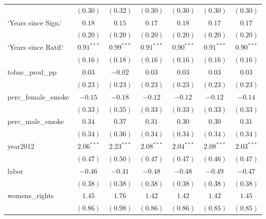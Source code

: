 \begin{table}[!h]
\begin{center}
\begin{tabular}{l c c c c c c }
                        & $(0.30)$     & $(0.32)$     & $(0.30)$     & $(0.30)$     & $(0.30)$     & $(0.30)$     \\
`Years since Sign.`     & $0.18$       & $0.15$       & $0.17$       & $0.18$       & $0.17$       & $0.17$       \\
                        & $(0.20)$     & $(0.20)$     & $(0.20)$     & $(0.20)$     & $(0.20)$     & $(0.20)$     \\
`Years since Ratif.`    & $0.91^{***}$ & $0.99^{***}$ & $0.91^{***}$ & $0.90^{***}$ & $0.91^{***}$ & $0.90^{***}$ \\
                        & $(0.16)$     & $(0.18)$     & $(0.16)$     & $(0.16)$     & $(0.16)$     & $(0.16)$     \\
tobac\_prod\_pp         & $0.03$       & $-0.02$      & $0.03$       & $0.03$       & $0.03$       & $0.03$       \\
                        & $(0.23)$     & $(0.23)$     & $(0.23)$     & $(0.23)$     & $(0.23)$     & $(0.23)$     \\
perc\_female\_smoke     & $-0.15$      & $-0.18$      & $-0.12$      & $-0.12$      & $-0.12$      & $-0.14$      \\
                        & $(0.33)$     & $(0.35)$     & $(0.33)$     & $(0.33)$     & $(0.33)$     & $(0.33)$     \\
perc\_male\_smoke       & $0.34$       & $0.37$       & $0.31$       & $0.30$       & $0.30$       & $0.31$       \\
                        & $(0.34)$     & $(0.36)$     & $(0.34)$     & $(0.34)$     & $(0.34)$     & $(0.34)$     \\
year2012                & $2.06^{***}$ & $2.23^{***}$ & $2.08^{***}$ & $2.04^{***}$ & $2.08^{***}$ & $2.03^{***}$ \\
                        & $(0.47)$     & $(0.50)$     & $(0.47)$     & $(0.47)$     & $(0.46)$     & $(0.47)$     \\
labor                   & $-0.46$      & $-0.41$      & $-0.48$      & $-0.48$      & $-0.49$      & $-0.47$      \\
                        & $(0.38)$     & $(0.38)$     & $(0.38)$     & $(0.38)$     & $(0.38)$     & $(0.38)$     \\
womens\_rights          & $1.45$       & $1.76$       & $1.42$       & $1.42$       & $1.42$       & $1.45$       \\
                        & $(0.86)$     & $(0.98)$     & $(0.86)$     & $(0.86)$     & $(0.85)$     & $(0.85)$     \\

\end{tabular}
\end{center}
\end{table}
